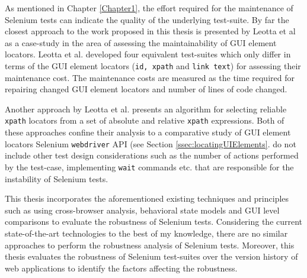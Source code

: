 As mentioned in Chapter \ref{Chapter1}, the effort required for the maintenance of Selenium tests can indicate the quality of the underlying test-suite. By far the closest approach to the work proposed in this thesis is presented by Leotta et al \cite{leotta2013comparing} as a case-study in the area of assessing the maintainability of GUI element locators. Leotta et al. developed four equivalent test-suites which only differ in terms of the GUI element locators (\texttt{id, xpath} and \texttt{link text}) for assessing their maintenance cost. The maintenance costs are measured as the time required for repairing changed GUI element locators and number of lines of code changed. 

Another approach by Leotta et al. presents an algorithm for selecting reliable \texttt{xpath} locators from a set of absolute and relative \texttt{xpath} expressions. 
Both of these approaches confine their analysis to a comparative study of GUI element locators Selenium \texttt{webdriver} API (see Section \ref{ssec:locatingUIElements}. do not include other test design considerations such as the number of actions performed by the test-case, implementing \texttt{wait} commands etc. that are responsible for the instability of Selenium tests. 

This thesis incorporates the aforementioned existing techniques and principles such as using cross-browser analysis, behavioral state models and GUI level comparisons to evaluate the robustness of Selenium tests. Considering the current state-of-the-art technologies to the best of my knowledge, there are no similar approaches to perform the robustness analysis of Selenium tests. Moreover, this thesis evaluates the robustness of Selenium test-suites over the version history of web applications to identify the factors affecting the robustness. 

